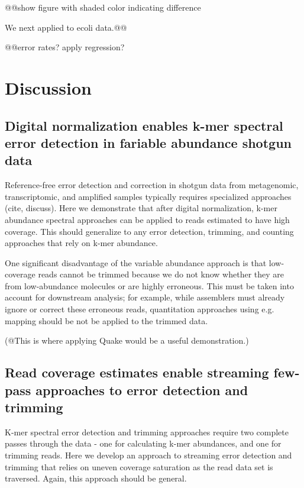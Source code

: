 \documentclass{article}
\begin{document}
@@show figure with shaded color indicating difference

We next applied to ecoli data.@@

@@error rates? apply regression?

\section{Discussion}

\subsection{Digital normalization enables k-mer spectral error detection in fariable abundance shotgun data}

Reference-free error detection and correction in shotgun data from
metagenomic, transcriptomic, and amplified samples typically requires
specialized approaches (cite, discuss).  Here we demonstrate
that after digital normalization, k-mer abundance spectral approaches
can be applied to reads estimated to have high coverage.  This should
generalize to any error detection, trimming, and counting approaches
that rely on k-mer abundance.

One significant disadvantage of the variable abundance approach is
that low-coverage reads cannot be trimmed because we do not know
whether they are from low-abundance molecules or are highly erroneous.
This must be taken into account for downstream analysis; for example,
while assemblers must already ignore or correct these erroneous reads,
quantitation approaches using e.g. mapping should be not be applied
to the trimmed data.

(@This is where applying Quake would be a useful demonstration.)


\subsection{Read coverage estimates enable streaming few-pass approaches to error detection and trimming}

K-mer spectral error detection and trimming approaches require two
complete passes through the data - one for calculating k-mer
abundances, and one for trimming reads.  Here we develop an approach
to streaming error detection and trimming that relies on uneven
coverage saturation as the read data set is traversed.  Again, this
approach should be general.
\end{document}

